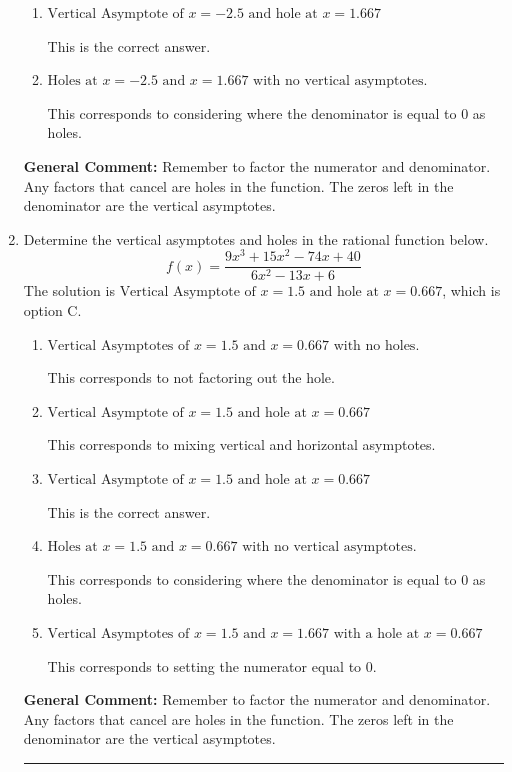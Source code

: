 \documentclass{extbook}[14pt]
\newcommand{\litem}[1]{\item #1

\rule{\textwidth}{0.4pt}}
\begin{document}
\begin{enumerate}
{\begin{enumerate}[label=\Alph*.]
This corresponds to not factoring out the hole.
\item \( \text{Vertical Asymptote of } x = -2.5 \text{ and hole at } x = 1.667 \)

This is the correct answer.
\item \( \text{Holes at } x = -2.5 \text{ and } x = 1.667 \text{ with no vertical asymptotes.} \)

This corresponds to considering where the denominator is equal to 0 as holes.
\end{enumerate}

\textbf{General Comment:} Remember to factor the numerator and denominator. Any factors that cancel are holes in the function. The zeros left in the denominator are the vertical asymptotes.
}
\litem{
Determine the vertical asymptotes and holes in the rational function below.
\[ f(x) = \frac{9x^{3} +15 x^{2} -74 x + 40}{6x^{2} -13 x + 6} \]The solution is \( \text{Vertical Asymptote of } x = 1.5 \text{ and hole at } x = 0.667 \), which is option C.\begin{enumerate}[label=\Alph*.]
\item \( \text{Vertical Asymptotes of } x = 1.5 \text{ and } x = 0.667 \text{ with no holes.} \)

This corresponds to not factoring out the hole.
\item \( \text{Vertical Asymptote of } x = 1.5 \text{ and hole at } x = 0.667 \)

This corresponds to mixing vertical and horizontal asymptotes.
\item \( \text{Vertical Asymptote of } x = 1.5 \text{ and hole at } x = 0.667 \)

This is the correct answer.
\item \( \text{Holes at } x = 1.5 \text{ and } x = 0.667 \text{ with no vertical asymptotes.} \)

This corresponds to considering where the denominator is equal to 0 as holes.
\item \( \text{Vertical Asymptotes of } x = 1.5 \text{ and } x = 1.667 \text{ with a hole at } x = 0.667 \)

This corresponds to setting the numerator equal to 0.
\end{enumerate}

\textbf{General Comment:} Remember to factor the numerator and denominator. Any factors that cancel are holes in the function. The zeros left in the denominator are the vertical asymptotes.
}
\end{enumerate}
\end{document}
